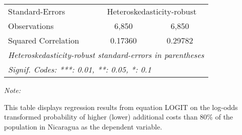 \begin{table}[htbp!]
\begin{adjustbox}{width = 1\textwidth, max height = 0.95\textheight, center}
\begin{threeparttable}[b]
\begin{tabular}{lcc}
            \midrule 
            Standard-Errors & \multicolumn{2}{c}{Heteroskedasticity-robust} \\ 
            Observations         & 6,850          & 6,850\\  
            Squared Correlation  & 0.17360        & 0.29782\\  
            \midrule \midrule
            \multicolumn{3}{l}{\emph{Heteroskedasticity-robust standard-errors in parentheses}}\\
            \multicolumn{3}{l}{\emph{Signif. Codes: ***: 0.01, **: 0.05, *: 0.1}}\\
         \end{tabular}
         
         \begin{tablenotes}\item \medskip \textit{Note:}
            \item This table displays regression results from equation LOGIT on the log-odds transformed probability of higher (lower) additional costs than 80\% of the population in Nicaragua as the dependent variable. 
         \end{tablenotes}
      \end{threeparttable}
   \end{adjustbox}
\end{table}


